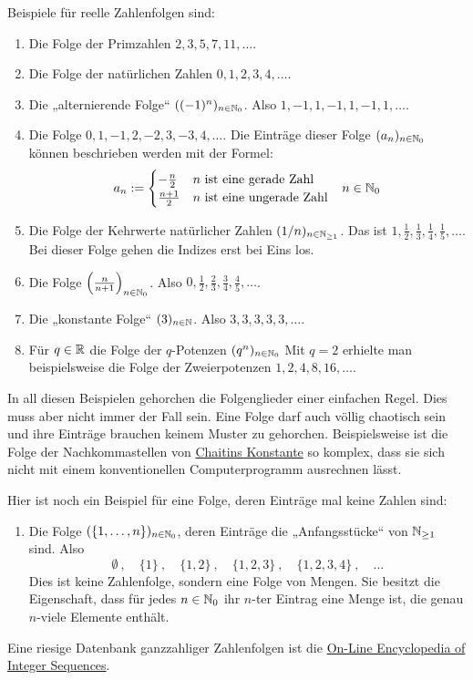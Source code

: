 \begin{bsp}
    Beispiele für reelle Zahlenfolgen sind:
    \begin{enumerate}
        \item Die Folge der Primzahlen $2,3,5,7,11,\dots$.
        \item Die Folge der natürlichen Zahlen $0,1,2,3,4,\dots$.
        \item Die „alternierende Folge“ $((-1)^n)_{n\in \mathbb N_0}$. Also $1,-1,1,-1,1,-1,1,\dots$.
        \item Die Folge $0,1,-1,2,-2,3,-3,4,\dots$. Die Einträge dieser Folge $(a_n)_{n\in \mathbb N_0}$ können beschrieben werden mit der Formel:
        \begin{align*}
            a_n := \begin{cases}
                -\frac{n}{2} & n\ \text{ist eine gerade Zahl} \\
                \frac{n+1}{2} & n\ \text{ist eine ungerade Zahl}
            \end{cases} && n \in \mathbb N_0
        \end{align*}
        \item Die Folge der Kehrwerte natürlicher Zahlen $(1/n)_{n\in \mathbb N_{\ge 1}}$. Das ist  $1,\frac{1}{2},\frac{1}{3},\frac{1}{4},\frac{1}{5},\dots$. Bei dieser Folge gehen die Indizes erst bei Eins los.
        \item Die Folge $\left(\frac{n}{n+1}\right)_{n\in \mathbb N_0}$. Also $0,\frac{1}{2},\frac{2}{3},\frac{3}{4},\frac{4}{5},\dots$.
        \item Die „konstante Folge“ $(3)_{n\in \mathbb N}$. Also $3,3,3,3,3,\dots$.
        \item Für $q\in \mathbb R$ die Folge der $q$-Potenzen $(q^n)_{n\in \mathbb N_0}$ Mit $q=2$ erhielte man beispielsweise die Folge der Zweierpotenzen $1,2,4,8,16,\dots$.
    \end{enumerate}
    In all diesen Beispielen gehorchen die Folgenglieder einer einfachen Regel. Dies muss aber nicht immer der Fall sein. Eine Folge darf auch völlig chaotisch sein und ihre Einträge brauchen keinem Muster zu gehorchen. Beispielsweise ist die Folge der Nachkommastellen von \href{https://de.wikipedia.org/wiki/Chaitinsche_Konstante}{Chaitins Konstante} so komplex, dass sie sich nicht mit einem konventionellen Computerprogramm ausrechnen lässt.
        
    Hier ist noch ein Beispiel für eine Folge, deren Einträge mal keine Zahlen sind:
    \begin{enumerate}[(9)]
        \item Die Folge $(\{1,\dots , n\})_{n\in \mathbb N_0}$, deren Einträge die „Anfangsstücke“ von $\mathbb N_{\ge 1}$ sind. Also
            \[ \emptyset\ ,\quad \{1\}\ ,\quad \{1,2\}\ ,\quad \{1,2,3\}\ ,\quad \{1,2,3,4\}\ , \quad \dots \]
        Dies ist keine Zahlenfolge, sondern eine Folge von Mengen. Sie besitzt die Eigenschaft, dass für jedes $n\in \mathbb N_0$ ihr $n$-ter Eintrag eine Menge ist, die genau $n$-viele Elemente enthält.
    \end{enumerate}
    Eine riesige Datenbank ganzzahliger Zahlenfolgen ist die \href{https://oeis.org/}{On-Line Encyclopedia of Integer Sequences}.
\end{bsp}


